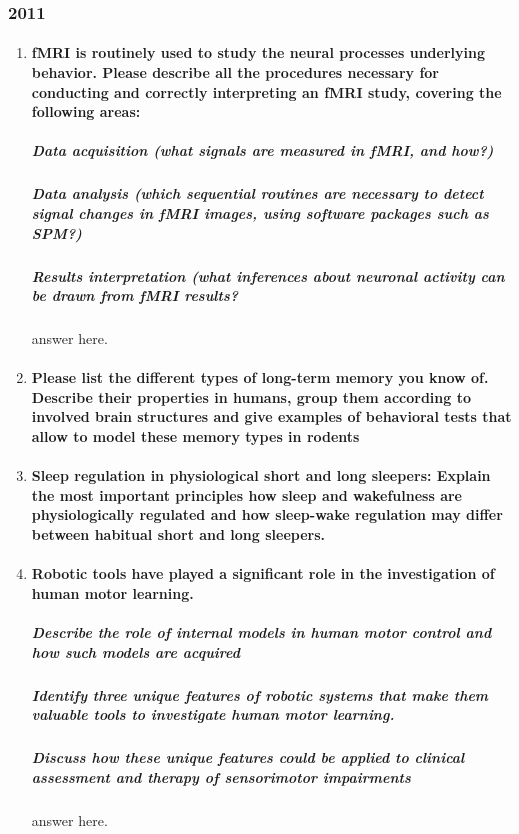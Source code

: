 \documentclass[12pt,article,oneside,a4paper]{memoir}
\begin{document}
\subsubsection{2011}
\begin{enumerate}
\item \paragraph{ fMRI is routinely used to study the neural processes underlying behavior. Please describe all the procedures necessary for conducting and correctly interpreting an fMRI study, covering the following areas:}
\subparagraph{Data acquisition (what signals are measured in fMRI, and how?)}
\subparagraph{Data analysis (which sequential routines are necessary to detect signal changes in fMRI images, using software packages such as SPM?)}
\subparagraph{Results interpretation (what inferences about neuronal activity can be drawn from fMRI results?}

answer here.

\item \paragraph{Please list the different types of long-term memory you know of. Describe their properties in humans, group them according to involved brain structures and give examples of behavioral tests that allow to model these memory types in rodents}

\item \paragraph{Sleep regulation in physiological short and long sleepers: Explain the most important principles how sleep and wakefulness are physiologically regulated and how sleep-wake regulation may differ between habitual short and long sleepers.}

\item \paragraph{Robotic tools have played a significant role in the investigation of human motor
learning.} \subparagraph{Describe the role of internal models in human motor control and how such
models are acquired} \subparagraph{Identify three unique features of robotic systems that make them valuable tools to investigate human motor learning.} \subparagraph{Discuss how these unique features could be applied to clinical assessment and therapy of sensorimotor impairments} answer here.


\end{enumerate}
\end{document}
